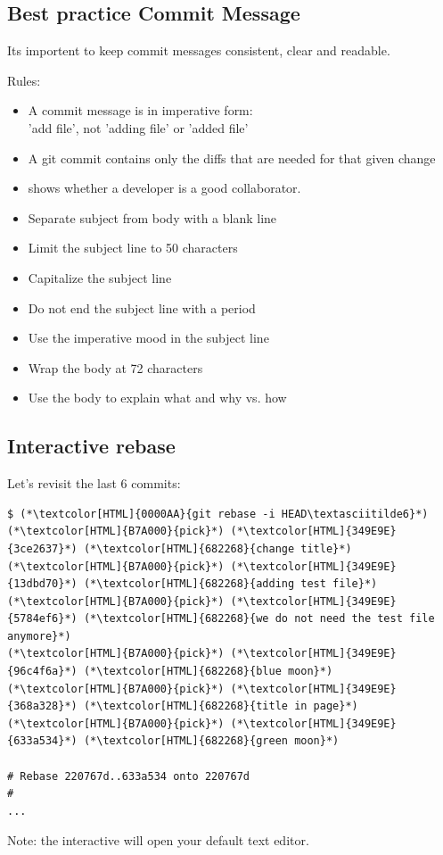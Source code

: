 \subsection{Best practice Commit Message}
\begin{frame}[fragile]
  \subslidetitle

  Its importent to keep commit messages consistent, clear and readable.
  \vspace{1em}

  Rules:
  \begin{itemize}
    \item A commit message is in imperative form: \\
      'add file', not 'adding file' or 'added file'
    \item A git commit contains only the diffs that are needed for that given change

    \item shows whether a developer is a good collaborator.

    \item Separate subject from body with a blank line
    \item Limit the subject line to 50 characters
    \item Capitalize the subject line
    \item Do not end the subject line with a period
    \item Use the imperative mood in the subject line
    \item Wrap the body at 72 characters
    \item Use the body to explain what and why vs. how
  \end{itemize}
\end{frame}

\subsection{Interactive rebase}
\begin{frame}[fragile]
  \subslidetitle

  Let's revisit the last 6 commits:
  \begin{lstlisting}
$ (*\textcolor[HTML]{0000AA}{git rebase -i HEAD\textasciitilde6}*)
(*\textcolor[HTML]{B7A000}{pick}*) (*\textcolor[HTML]{349E9E}{3ce2637}*) (*\textcolor[HTML]{682268}{change title}*)
(*\textcolor[HTML]{B7A000}{pick}*) (*\textcolor[HTML]{349E9E}{13dbd70}*) (*\textcolor[HTML]{682268}{adding test file}*)
(*\textcolor[HTML]{B7A000}{pick}*) (*\textcolor[HTML]{349E9E}{5784ef6}*) (*\textcolor[HTML]{682268}{we do not need the test file anymore}*)
(*\textcolor[HTML]{B7A000}{pick}*) (*\textcolor[HTML]{349E9E}{96c4f6a}*) (*\textcolor[HTML]{682268}{blue moon}*)
(*\textcolor[HTML]{B7A000}{pick}*) (*\textcolor[HTML]{349E9E}{368a328}*) (*\textcolor[HTML]{682268}{title in page}*)
(*\textcolor[HTML]{B7A000}{pick}*) (*\textcolor[HTML]{349E9E}{633a534}*) (*\textcolor[HTML]{682268}{green moon}*)

# Rebase 220767d..633a534 onto 220767d
#
...
\end{lstlisting}

  Note: the interactive  will open your default text editor.
\end{frame}

